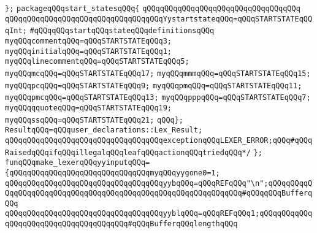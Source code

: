 \verb|};|\newline
\verb|packageqQQqstart_statesqQQq{|\newline
\verb|qQQqqQQqqQQqqQQqqQQqqQQqqQQqqQQqqQQq|\newline
\verb|qQQqqQQqqQQqqQQqqQQqqQQqqQQqqQQqqQQqYystartstateqQQq=qQQqSTARTSTATEqQQqInt;|\newline
\newline
\verb|#qQQqqQQqstartqQQqstateqQQqdefinitionsqQQq|\newline
\newline
\verb|myqQQqcommentqQQq=qQQqSTARTSTATEqQQq3;|\newline
\verb|myqQQqinitialqQQq=qQQqSTARTSTATEqQQq1;|\newline
\verb|myqQQqlinecommentqQQq=qQQqSTARTSTATEqQQq5;|\newline
\verb|myqQQqmcqQQq=qQQqSTARTSTATEqQQq17;|\newline
\verb|myqQQqmmmqQQq=qQQqSTARTSTATEqQQq15;|\newline
\verb|myqQQqpcqQQq=qQQqSTARTSTATEqQQq9;|\newline
\verb|myqQQqpmqQQq=qQQqSTARTSTATEqQQq11;|\newline
\verb|myqQQqpmcqQQq=qQQqSTARTSTATEqQQq13;|\newline
\verb|myqQQqpppqQQq=qQQqSTARTSTATEqQQq7;|\newline
\verb|myqQQqqquoteqQQq=qQQqSTARTSTATEqQQq19;|\newline
\verb|myqQQqssqQQq=qQQqSTARTSTATEqQQq21;|\newline
\newline
\verb|qQQq};|\newline
\verb|ResultqQQq=qQQquser_declarations::Lex_Result;|\newline
\verb|qQQqqQQqqQQqqQQqqQQqqQQqqQQqqQQqqQQqexceptionqQQqLEXER_ERROR;qQQq#qQQqRaisedqQQqifqQQqillegalqQQqleafqQQqactionqQQqtriedqQQq*/|\newline
\verb|};|\newline
\newline
\verb|funqQQqmake_lexerqQQqyyinputqQQq=|\newline
\verb|{qQQqqQQqqQQqqQQqqQQqqQQqqQQqqQQqmyqQQqyygone0=1;|\newline
\verb|qQQqqQQqqQQqqQQqqQQqqQQqqQQqqQQqqQQqyybqQQq=qQQqREFqQQq"\n";qQQqqQQqqQQqqQQqqQQqqQQqqQQqqQQqqQQqqQQqqQQqqQQqqQQqqQQqqQQqqQQq#qQQqqQQqBufferqQQq|\newline
\verb|qQQqqQQqqQQqqQQqqQQqqQQqqQQqqQQqqQQqyyblqQQq=qQQqREFqQQq1;qQQqqQQqqQQqqQQqqQQqqQQqqQQqqQQqqQQqqQQq#qQQqBufferqQQqlengthqQQq|\newline

